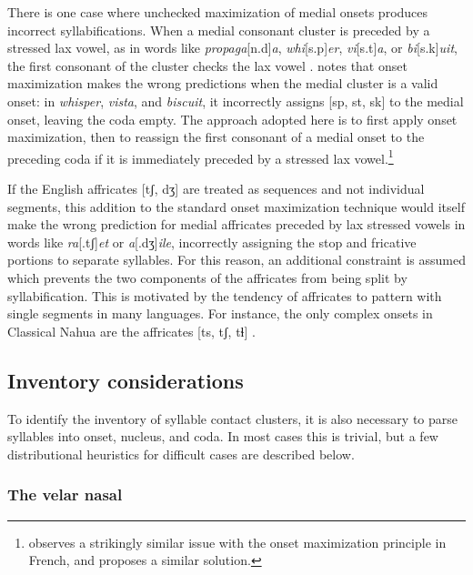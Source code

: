 There is one case where unchecked maximization of medial onsets produces incorrect syllabifications. When a medial consonant cluster is preceded by a stressed lax vowel, as in words like \emph{propaga}[n.d]\emph{a}, \emph{whi}[s.p]\emph{er}, \emph{vi}[s.t]\emph{a}, or \emph{bi}[s.k]\emph{uit}, the first consonant of the cluster checks the lax vowel \citep[e.g.,][3]{Hammond1997}. \citet[][55]{Harris1994} notes that onset maximization makes the wrong predictions when the medial cluster is a valid onset: in \emph{whisper}, \emph{vista}, and \emph{biscuit}, it incorrectly assigns [sp, st, sk] to the medial onset, leaving the coda empty. The approach adopted here is to first apply onset maximization, then to reassign the first consonant of a medial onset to the preceding coda if it is immediately preceded by a stressed lax vowel.\footnote{\citet[][589f.]{Lowenstamm1981} observes a strikingly similar issue with the onset maximization principle in French, and proposes a similar solution.}

If the English affricates [tʃ, dʒ] are treated as sequences and not individual segments, this addition to the standard onset maximization technique would itself make the wrong prediction for medial affricates preceded by lax stressed vowels in words like \emph{ra}[.tʃ]\emph{et} or \emph{a}[.dʒ]\emph{ile}, incorrectly assigning the stop and fricative portions to separate syllables. For this reason, an additional constraint is assumed which prevents the two components of the affricates from being split by syllabification. This is motivated by the tendency of affricates to pattern with single segments in many languages. For instance, the only complex onsets in Classical Nahua are the affricates [ts, tʃ, tɬ] \citep[][9]{Launey2011}.


\subsection{Inventory considerations}

To identify the inventory of syllable contact clusters, it is also necessary to parse syllables into onset, nucleus, and coda. In most cases this is trivial, but a few distributional heuristics for difficult cases are described below.

\subsubsection{The velar nasal}
\label{velarnasal}

